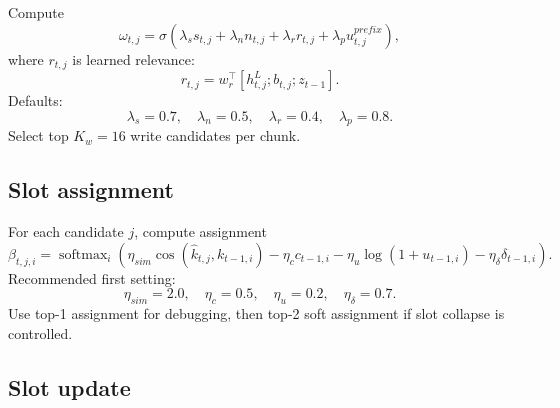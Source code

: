 \documentclass[11pt]{article}
\newcommand{\softmax}{\operatorname{softmax}}
\newcommand{\cosine}{\operatorname{cos}}
\begin{document}
Compute
\begin{equation}
    \omega_{t,j}=\sigma\left(
        \lambda_s s_{t,j}+\lambda_n n_{t,j}+\lambda_r r_{t,j}+\lambda_p u^{prefix}_{t,j}
    \right),
\end{equation}
where \(r_{t,j}\) is learned relevance:
\begin{equation}
    r_{t,j}=w_r^\top[h_{t,j}^L;b_{t,j};z_{t-1}].
\end{equation}
Defaults:
\begin{equation}
    \lambda_s=0.7,\quad \lambda_n=0.5,\quad \lambda_r=0.4,\quad \lambda_p=0.8.
\end{equation}
Select top \(K_w=16\) write candidates per chunk.

\subsection{Slot assignment}

For each candidate \(j\), compute assignment
\begin{equation}
    \beta_{t,j,i}=\softmax_i\left(
        \eta_{sim}\cosine(\hat{k}_{t,j},k_{t-1,i})
        -\eta_c c_{t-1,i}
        -\eta_u \log(1+u_{t-1,i})
        -\eta_\delta \delta_{t-1,i}
    \right).
\end{equation}
Recommended first setting:
\begin{equation}
    \eta_{sim}=2.0,\quad \eta_c=0.5,\quad \eta_u=0.2,\quad \eta_\delta=0.7.
\end{equation}
Use top-1 assignment for debugging, then top-2 soft assignment if slot collapse is controlled.

\subsection{Slot update}
\end{document}
